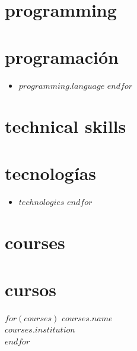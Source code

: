 \documentclass[letterpaper,12pt]{article}
\newcommand{\lightfont}[1]{{%
    {\hlight\color{light-gray}#1}
  }}
\newcommand{\emphasized}[1]{{%
    {\fontsize{12pt}{14pt}\textbf{#1}}
  }}
\begin{document}
\begin{minipage}[t]{0.31\textwidth}
  \raggedright
        {\section{programming}}
        {\section{programación}}%
    \hlight
    \begin{itemize}[]
      $for(programming)$
      \item\emphasized{$programming.language$}
      $endfor$
    \end{itemize}

        {\section{technical skills}}
        {\section{tecnologías}}%
    \hlight
    \begin{itemize}[]
      $for(technologies)$
      \item{$technologies$}
      $endfor$
    \end{itemize}

        {\section{courses}}
        {\section{cursos}}%
    \hlight
    $for(courses)$
    \emphasized{$courses.name$} \\
    \lightfont{\textbf{$courses.institution$}} \\
    $endfor$
\end{minipage}%
%
\newlength{\hwide}
\newlength{\hwideright}
\newlength{\buffer}
\setlength{\buffer}{4pt plus 1pt minus 1pt}
%
\end{document}
